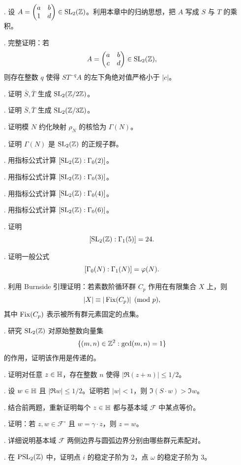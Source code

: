 \begin{enumerate}
  \item[\medium 26.] 设 $A=\begin{pmatrix} a&b\\ 1&d \end{pmatrix}\in \mathrm{SL}_2(\mathbb{Z})$。利用本章中的归纳思想，把 $A$ 写成 $S$ 与 $T$ 的乘积。
  \item[\medium 27.] 完整证明：若
  \[
  A=\begin{pmatrix} a&b\\ c&d \end{pmatrix}\in \mathrm{SL}_2(\mathbb{Z}),
  \]
  则存在整数 $q$ 使得 $ST^{-q}A$ 的左下角绝对值严格小于 $|c|$。
  \item[\medium 28.] 证明 $\bar S,\bar T$ 生成 $\mathrm{SL}_2(\mathbb{Z}/2\mathbb{Z})$。
  \item[\medium 29.] 证明 $\bar S,\bar T$ 生成 $\mathrm{SL}_2(\mathbb{Z}/3\mathbb{Z})$。
  \item[\medium 30.] 证明模 $N$ 约化映射 $\rho_N$ 的核恰为 $\Gamma(N)$。
  \item[\medium 31.] 证明 $\Gamma(N)$ 是 $\mathrm{SL}_2(\mathbb{Z})$ 的正规子群。
  \item[\medium 32.] 用指标公式计算 $[\mathrm{SL}_2(\mathbb{Z}):\Gamma_0(2)]$。
  \item[\medium 33.] 用指标公式计算 $[\mathrm{SL}_2(\mathbb{Z}):\Gamma_0(3)]$。
  \item[\medium 34.] 用指标公式计算 $[\mathrm{SL}_2(\mathbb{Z}):\Gamma_0(4)]$。
  \item[\medium 35.] 用指标公式计算 $[\mathrm{SL}_2(\mathbb{Z}):\Gamma_0(6)]$。
  \item[\medium 36.] 证明
  \[
  [\mathrm{SL}_2(\mathbb{Z}):\Gamma_1(5)]=24.
  \]
  \item[\medium 37.] 证明一般公式
  \[
  [\Gamma_0(N):\Gamma_1(N)]=\varphi(N).
  \]
  \item[\medium 38.] 利用 Burnside 引理证明：若素数阶循环群 $C_p$ 作用在有限集合 $X$ 上，则
  \[
  |X|\equiv |\operatorname{Fix}(C_p)|\pmod p,
  \]
  其中 $\operatorname{Fix}(C_p)$ 表示被所有群元素固定的点集。
  \item[\medium 39.] 研究 $\mathrm{SL}_2(\mathbb{Z})$ 对原始整数向量集
  \[
  \{(m,n)\in\mathbb{Z}^2:\gcd(m,n)=1\}
  \]
  的作用，证明该作用是传递的。
  \item[\medium 40.] 证明对任意 $z\in\mathbb{H}$，存在整数 $n$ 使得 $|\Re(z+n)|\le 1/2$。
  \item[\medium 41.] 设 $w\in\mathbb{H}$ 且 $|\Re w|\le 1/2$。证明若 $|w|<1$，则 $\Im(S\cdot w)>\Im w$。
  \item[\medium 42.] 结合前两题，重新证明每个 $z\in\mathbb{H}$ 都与基本域 $\mathcal F$ 中某点等价。
  \item[\medium 43.] 证明：若 $z,w\in\mathcal F^\circ$ 且 $w=\gamma\cdot z$，则 $z=w$。
  \item[\medium 44.] 详细说明基本域 $\mathcal F$ 两侧边界与圆弧边界分别由哪些群元素配对。
  \item[\medium 45.] 在 $\mathrm{PSL}_2(\mathbb{Z})$ 中，证明点 $i$ 的稳定子阶为 $2$，点 $\omega$ 的稳定子阶为 $3$。

\end{enumerate}
